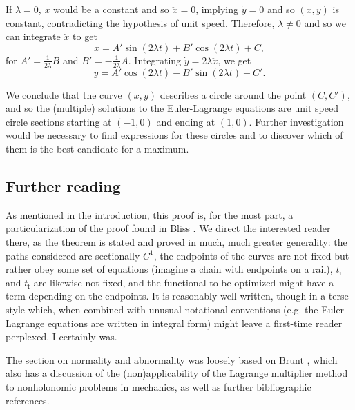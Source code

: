 \documentclass{article}
\theoremstyle{plain}
\theoremstyle{plain}
\theoremstyle{nonumberplain}
\theoremstyle{empty}
\newcommand{\tstart}{\mathrm{i}}
\newcommand{\tend}{\mathrm{f}}
\begin{document}
If $\lambda = 0$, $x$ would be a constant and so $\ddot x = 0$, implying $\dot y = 0$ and so $(x,y)$ is constant, contradicting the hypothesis of unit speed. Therefore, $\lambda \neq 0$ and so we can integrate $\dot x$ to get
\[x = A' \sin(2 \lambda t) + B' \cos(2 \lambda t) + C,\]
for $A' = \frac1{2 \lambda} B$ and $B' = -\frac1{2\lambda} A$. Integrating $\dot y = 2 \lambda \ddot x$, we get
\[y = A' \cos(2 \lambda t) - B' \sin(2 \lambda t) + C'.\]

We conclude that the curve $(x,y)$ describes a circle around the point $(C, C')$, and so the (multiple) solutions to the Euler-Lagrange equations are unit speed circle sections starting at $(-1,0)$ and ending at $(1,0)$. Further investigation would be necessary to find expressions for these circles and to discover which of them is the best candidate for a maximum.

\subsection{Further reading}

As mentioned in the introduction, this proof is, for the most part, a particularization of the proof found in Bliss \cite[pp.~187-202]{bliss}. We direct the interested reader there, as the theorem is stated and proved in much, much greater generality: the paths considered are sectionally $C^1$, the endpoints of the curves are not fixed but rather obey some set of equations (imagine a chain with endpoints on a rail), $t_\tstart$ and $t_\tend$ are likewise not fixed, and the functional to be optimized might have a term depending on the endpoints. It is reasonably well-written, though in a terse style which, when combined with unusual notational conventions (e.g. the Euler-Lagrange equations are written in integral form) might leave a first-time reader perplexed. I certainly was.

The section on normality and abnormality was loosely based on Brunt \cite[pp.~128,129]{brunt}, which also has a discussion of the (non)applicability of the Lagrange multiplier method to nonholonomic problems in mechanics, as well as further bibliographic references.
\end{document}
